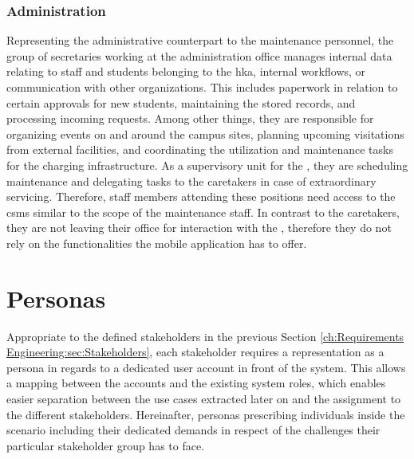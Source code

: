 \subsubsection{Administration}
\label{ch:Requirements Engineering:sec:Stakeholders:ssec:Staff:sssec:Administration}

Representing the administrative counterpart to the maintenance personnel, the group of secretaries working at the administration office manages internal data relating to staff and students belonging to the \acrshort{hka}, internal workflows, or communication with other organizations. 
This includes paperwork in relation to certain approvals for new students, maintaining the stored records, and processing incoming requests. Among other things, they are responsible for organizing events on and around the campus sites, planning upcoming visitations from external facilities, and coordinating the utilization and maintenance tasks for the charging infrastructure.
As a supervisory unit for the , they are scheduling maintenance and delegating tasks to the caretakers in case of extraordinary servicing.  
Therefore, staff members attending these positions need access to the \acrshort{csms} similar to the scope of the maintenance staff. In contrast to the caretakers, they are not leaving their office for interaction with the , therefore they do not rely on the functionalities the mobile application has to offer.

\section{Personas}
\label{ch:Requirements Engineering:sec:Personas}

Appropriate to the defined stakeholders in the previous Section \ref{ch:Requirements Engineering:sec:Stakeholders}, each stakeholder requires a representation as a persona in regards to a dedicated user account in front of the system.
This allows a mapping between the accounts and the existing system roles, which enables easier separation between the use cases extracted later on and the assignment to the different stakeholders. 
Hereinafter, personas prescribing individuals inside the scenario including their dedicated demands in respect of the challenges their particular stakeholder group has to face. 

